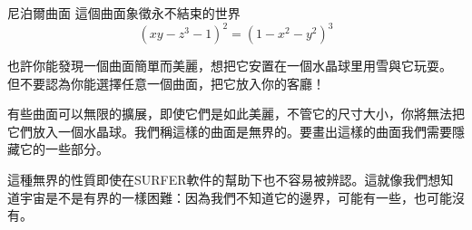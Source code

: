 \begin{surferPage}{尼泊爾曲面}
 這個曲面象徵永不結束的世界\\

\smallskip
\[(x y - z^3 -1)^2= (1 - x^2	- y^2)^3\]

\singlespacing

也許你能發現一個曲面簡單而美麗，想把它安置在一個水晶球里用雪與它玩耍。 但不要認為你能選擇任意一個曲面，把它放入你的客廳！\\

\singlespacing

有些曲面可以無限的擴展，即使它們是如此美麗，不管它的尺寸大小，你將無法把它們放入一個水晶球。我們稱這樣的曲面是無界的。要畫出這樣的曲面我們需要隱藏它的一些部分。\\

\singlespacing

這種無界的性質即使在SURFER軟件的幫助下也不容易被辨認。這就像我們想知道宇宙是不是有界的一樣困難：因為我們不知道它的邊界，可能有一些，也可能沒有。
\end{surferPage}

